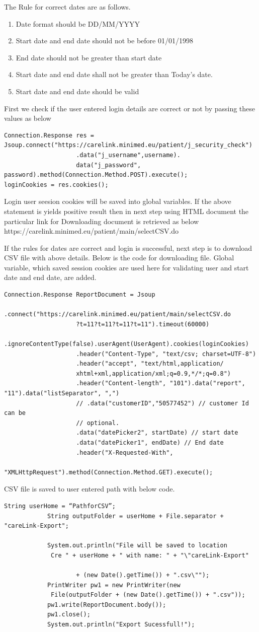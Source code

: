 \documentclass[12pt]{report}
\begin{document}
The Rule for correct dates are as follows.
\begin{enumerate} [label=(\alph*)]
\item Date format should be DD/MM/YYYY
\item Start date and end date should not be before 01/01/1998
\item End date should not be greater than start date
\item Start date and end date shall not be greater than Today’s date.
\item Start date and end date should be valid
\end{enumerate}
First we check if the user entered login details are correct or not by passing these values as below
\begin{verbatim}
Connection.Response res = 
Jsoup.connect("https://carelink.minimed.eu/patient/j_security_check")
					.data("j_username",username).
					data("j_password", password).method(Connection.Method.POST).execute();
loginCookies = res.cookies();
\end{verbatim}
Login user seesion cookies will be saved into global variables.
If the above statement is yields positive result then in next step using HTML document the particular link for Downloading document is retrieved as below
https://carelink.minimed.eu/patient/main/selectCSV.do

If the rules for dates are correct and login is successful, next step is to download CSV file with above details. Below is the code for downloading file. Global variable, which saved session cookies are used here for validating user and start date and end date, are added.
\begin{verbatim}
Connection.Response ReportDocument = Jsoup
					.connect("https://carelink.minimed.eu/patient/main/selectCSV.do
					?t=11?t=11?t=11?t=11").timeout(60000)
					.ignoreContentType(false).userAgent(UserAgent).cookies(loginCookies)
					.header("Content-Type", "text/csv; charset=UTF-8")
					.header("accept", "text/html,application/
					xhtml+xml,application/xml;q=0.9,*/*;q=0.8")
					.header("Content-length", "101").data("report", "11").data("listSeparator", ",")
					// .data("customerID","50577452") // customer Id can be
					// optional.
					.data("datePicker2", startDate) // start date
					.data("datePicker1", endDate) // End date
					.header("X-Requested-With",
					 "XMLHttpRequest").method(Connection.Method.GET).execute();
\end{verbatim}
CSV file is saved to user entered path with below code.
\begin{verbatim}
String userHome = “PathforCSV”;
			String outputFolder = userHome + File.separator + "careLink-Export";
			
			System.out.println("File will be saved to location
			 Cre " + userHome + " with name: " + "\"careLink-Export"
			
					+ (new Date().getTime()) + ".csv\"");
			PrintWriter pw1 = new PrintWriter(new
			 File(outputFolder + (new Date().getTime()) + ".csv"));
			pw1.write(ReportDocument.body());
			pw1.close();
			System.out.println("Export Sucessfull!");
\end{verbatim}
\end{document}
